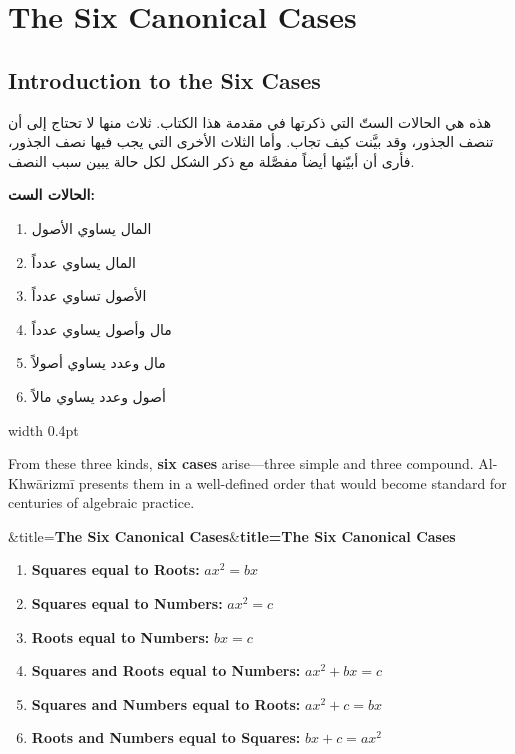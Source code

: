 \documentclass[11pt,a4paper]{book}
\newenvironment{transbox}[1][]{%
  \smallskip\par\noindent
  \begin{lrbox}{\transboxsave}
  \begin{minipage}{\dimexpr\linewidth-2\fboxsep-2\fboxrule\relax}%
  \setlength{\parskip}{0.3em}%
  \ifx&#1&\else\textbf{#1}\\[0.2cm]\fi
}{%
  \end{minipage}%
  \end{lrbox}
  \fcolorbox{rulecolor}{transbg}{\usebox{\transboxsave}}%
  \smallskip}
\begin{document}
\chapter{The Six Canonical Cases}
\label{ch:six-cases}

\section*{Introduction to the Six Cases}

\noindent\begin{minipage}[t]{0.48\textwidth}
\raggedleft

\begin{Arabic}
هذه هي الحالات الستّ التي ذكرتها في مقدمة هذا الكتاب. ثلاث منها لا تحتاج إلى أن تنصف الجذور، وقد بيَّنت كيف تجاب. وأما الثلاث الأخرى التي يجب فيها نصف الجذور، فأرى أن أبيّنها أيضاً مفصَّلة مع ذكر الشكل لكل حالة يبين سبب النصف.

\textbf{الحالات الست:}
\begin{enumerate}[label=\arabic*.]
\item المال يساوي الأصول
\item المال يساوي عدداً
\item الأصول تساوي عدداً
\item مال وأصول يساوي عدداً
\item مال وعدد يساوي أصولاً
\item أصول وعدد يساوي مالاً
\end{enumerate}
\end{Arabic}

\end{minipage}%
\hfill\vrule width 0.4pt\hfill
\begin{minipage}[t]{0.48\textwidth}
\raggedright

From these three kinds, \textbf{six cases} arise---three simple and three compound. Al-Khw\=arizm\={i} presents them in a well-defined order that would become standard for centuries of algebraic practice.

\begin{transbox}[title={\textbf{The Six Canonical Cases}}]
\begin{enumerate}[label=\textbf{Case \Roman*:},leftmargin=2.5em,topsep=2pt]
  \item \textbf{Squares equal to Roots:} $ax^2 = bx$
  \item \textbf{Squares equal to Numbers:} $ax^2 = c$
  \item \textbf{Roots equal to Numbers:} $bx = c$
  \item \textbf{Squares and Roots equal to Numbers:} $ax^2 + bx = c$
  \item \textbf{Squares and Numbers equal to Roots:} $ax^2 + c = bx$
  \item \textbf{Roots and Numbers equal to Squares:} $bx + c = ax^2$
\end{enumerate}
\end{transbox}

\end{minipage}
\vspace{0.3cm}
\end{document}
